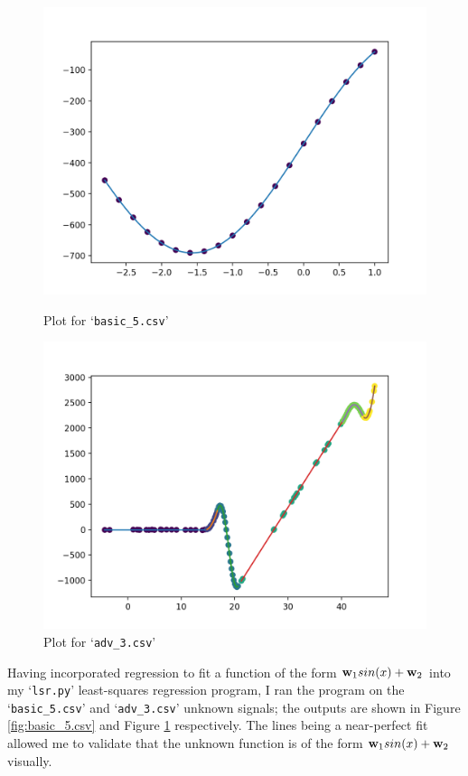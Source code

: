 \documentclass[onecolumn, 12pt, a4paper]{article}
\begin{document}
\begin{figure}[htbp]
\centering
\begin{minipage}[b]{.49\textwidth}
    \includegraphics[width=\textwidth]{images/basic_5.png}
    \caption{Plot for `\texttt{basic\_5.csv}'}
    \label{fig:basic_5.csv}
\end{minipage}
\hfill
\begin{minipage}[b]{.49\textwidth}
    \includegraphics[width=\textwidth]{images/adv_3.png}
    \caption{Plot for `\texttt{adv\_3.csv}'}
    \label{fig:adv_3.csv}
\end{minipage}
\end{figure}

Having incorporated regression to fit a function of the
form $\vb{w}_{1}sin(x) + \vb{w}_{2}$ into my 
`\texttt{lsr.py}'
least-squares regression program, I ran the program on
the `\texttt{basic\_5.csv}' and `\texttt{adv\_3.csv}'
unknown signals;
the outputs are shown in Figure \ref{fig:basic_5.csv}
and Figure \ref{fig:adv_3.csv} respectively.
The lines being a near-perfect fit allowed me to
validate that the unknown function is of
the form $\vb{w}_{1}sin(x) + \vb{w}_{2}$ visually.
\end{document}
